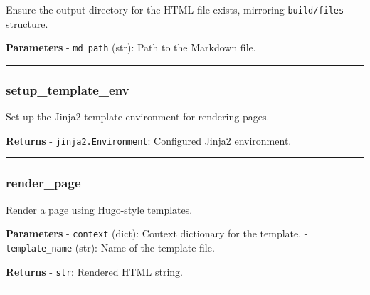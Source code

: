 Ensure the output directory for the HTML file exists, mirroring
\texttt{build/files} structure.

\textbf{Parameters} - \texttt{md\_path} (str): Path to the Markdown
file.

\begin{center}\rule{0.5\linewidth}{0.5pt}\end{center}

\subsubsection{setup\_template\_env}\label{setup_template_env}

\begin{Shaded}
\begin{Highlighting}[]
\end{Highlighting}
\end{Shaded}

Set up the Jinja2 template environment for rendering pages.

\textbf{Returns} - \texttt{jinja2.Environment}: Configured Jinja2
environment.

\begin{center}\rule{0.5\linewidth}{0.5pt}\end{center}

\subsubsection{render\_page}\label{render_page}

\begin{Shaded}
\begin{Highlighting}[]
\NormalTok{) }\OperatorTok{{-}\textgreater{}} 
\end{Highlighting}
\end{Shaded}

Render a page using Hugo-style templates.

\textbf{Parameters} - \texttt{context} (dict): Context dictionary for
the template. - \texttt{template\_name} (str): Name of the template
file.

\textbf{Returns} - \texttt{str}: Rendered HTML string.

\begin{center}\rule{0.5\linewidth}{0.5pt}\end{center}

